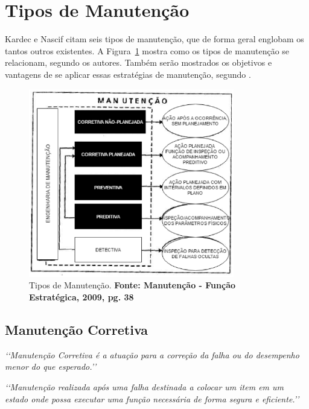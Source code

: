 \section{Tipos de Manutenção}
\label{tipos-man}


Kardec e Nascif citam seis tipos de manutenção, que de forma geral englobam os tantos outros existentes. A Figura~\ref{tiposmanutencao} mostra como os tipos de manutenção se relacionam, segundo os autores. 
Também serão mostrados os objetivos e vantagens de se aplicar essas estratégias de manutenção, segundo \cite{pereira2011engenharia}.

\graphicspath{{figuras/}}
\begin{figure}[H]
\centering
\includegraphics[width=0.8\textwidth]{tipos-de-manutencao}
\caption{Tipos de Manutenção. \textbf{Fonte: Manutenção - Função Estratégica, 2009, pg. 38\hfill}}
\label{tiposmanutencao}
\end{figure}


\subsection{Manutenção Corretiva}

		\emph{\lq\lq Manutenção Corretiva é a atuação para a correção da falha ou do desempenho menor do que esperado.\rq\rq} \cite{kardecnascif2010}

		\emph{\lq\lq Manutenção realizada após uma falha destinada a colocar um item em um estado onde possa executar uma função necessária de forma segura e eficiente.\rq\rq} \cite{british1993bs}

